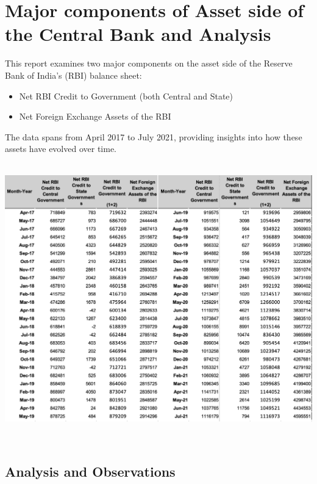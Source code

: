 \documentclass[a4paper,12pt]{extarticle} %
\begin{document}
\section{Major components of Asset side of the Central Bank and Analysis}
This report examines two major components on the asset side of the Reserve Bank of India's (RBI) balance sheet: \cite{hb2023164}\cite{hb2022164}\cite{hb2021164}\cite{hb2020164}\cite{hb2019164}\cite{hb2018164}
\begin{itemize}
    \item Net RBI Credit to Government (both Central and State)
    \item Net Foreign Exchange Assets of the RBI
\end{itemize}
The data spans from April 2017 to July 2021, providing insights into how these assets have evolved over time.\\
\\
\begin{center}
    \includegraphics[width=1\textwidth]{Q7/2.png} 
\end{center}\\


\subsection{Analysis and Observations}
\end{document}
